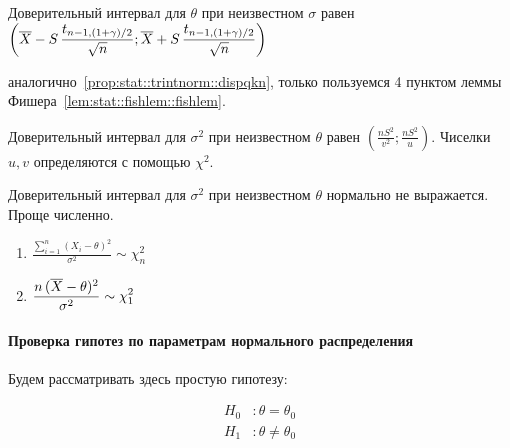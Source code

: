 \documentclass[12pt,ebook]{../../../notes}
\begin{document}
\begin{prop}\label{prop:stat::trintnorm::qdispukn}
  Доверительный интервал для $\theta$ при неизвестном $\sigma$ равен 
  $\displaystyle \left( \overline{X} - S \, \frac{t_{n-1,(1+\gamma)/2}}{ \sqrt n} ;
  \overline{X} + S \, \frac{t_{n-1,(1+\gamma)/2}}{\sqrt n} \right)$
\end{prop}
\begin{itlproof}
  аналогично~\ref{prop:stat::trintnorm::dispqkn}, только пользуемся 4 пунктом леммы
  Фишера~\ref{lem:stat::fishlem::fishlem}.
\end{itlproof}

\begin{prop}\label{prop:stat::trintnorm::dispqukn}
  Доверительный интервал для $\sigma^2$ при неизвестном $\theta$ равен 
  $\displaystyle \left( \frac{n S^2}{v^2} ; \frac{n S^2}{u} \right)$. Чиселки $u,v$ определяются
  с помощью $\chi^2$.
\end{prop}

\begin{prop}\label{prop:stat::trintnorm::dispqkn}
  Доверительный интервал для $\sigma^2$ при неизвестном $\theta$ нормально не выражается. Проще
  численно.
  \begin{enumerate}
    \item $\displaystyle \frac{\sum_{i=1}^n (X_i - \theta)^2}{\sigma^2} \sim \chi_n^2 $
    \item $\displaystyle \frac{n\, (\overline{X} - \theta)^2}{\sigma^2} \sim \chi_1^2 $
  \end{enumerate}
\end{prop}

\paragraph{Проверка гипотез по параметрам нормального распределения}
\label{par:stat::hypnorm}

Будем рассматривать здесь простую гипотезу:

\[
  \begin{split}
    H_0 & \colon \theta = \theta_0 \\
    H_1 & \colon \theta \neq \theta_0 
  \end{split}
  \]
\end{document}

